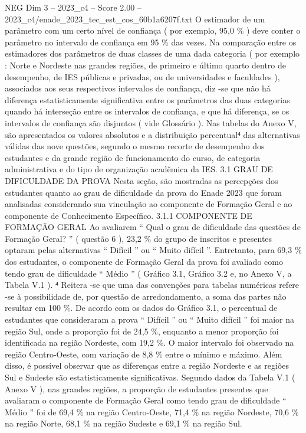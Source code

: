\begin{textsample}{NEG Dim 3 – 2023\_c4 – Score 2.00 – 2023\_c4/enade\_2023\_tec\_est\_cos\_60b1a6207f.txt}
O estimador de um parâmetro com um certo nível de confiança ( por exemplo, 95,0 \% ) deve conter o parâmetro no intervalo de confiança em 95 \% das vezes.
Na comparação entre os estimadores dos parâmetros de duas classes de uma dada categoria ( por exemplo : Norte e Nordeste nas grandes regiões, de primeiro e último quarto dentro de desempenho, de IES públicas e privadas, ou de universidades e faculdades ), associados aos seus respectivos intervalos de confiança, diz -se que não há diferença estatisticamente significativa entre os parâmetros das duas categorias quando há interseção entre os intervalos de confiança, e que há diferença, se os intervalos de confiança são disjuntos ( vide Glossário ).
Nas tabelas do Anexo V, são apresentados os valores absolutos e a distribuição percentual⁴ das alternativas válidas das nove questões, segundo o mesmo recorte de desempenho dos estudantes e da grande região de funcionamento do curso, de categoria administrativa e do tipo de organização acadêmica da IES. 3.1 GRAU DE DIFICULDADE DA PROVA Nesta seção, são mostradas as percepções dos estudantes quanto ao grau de dificuldade da prova do Enade 2023 que foram analisadas considerando sua vinculação ao componente de Formação Geral e ao componente de Conhecimento Específico. 3.1.1 COMPONENTE DE FORMAÇÃO GERAL Ao avaliarem “ Qual o grau de dificuldade das questões de Formação Geral? ” ( questão 6 ), 23,2 \% do grupo de inscritos e presentes optaram pelas alternativas “ Difícil ” ou “ Muito difícil ”.
Entretanto, para 69,3 \% dos estudantes, o componente de Formação Geral da prova foi avaliado como tendo grau de dificuldade “ Médio ” ( Gráfico 3.1, Gráfico 3.2 e, no Anexo V, a Tabela V.1 ). ⁴ Reitera -se que uma das convenções para tabelas numéricas refere -se à possibilidade de, por questão de arredondamento, a soma das partes não resultar em 100 \%.
De acordo com os dados do Gráfico 3.1, o percentual de estudantes que consideraram a prova “ Difícil ” ou “ Muito difícil ” foi maior na região Sul, onde a proporção foi de 24,5 \%, enquanto a menor proporção foi identificada na região Nordeste, com 19,2 \%.
O maior intervalo foi observado na região Centro-Oeste, com variação de 8,8 \% entre o mínimo e máximo.
Além disso, é possível observar que as diferenças entre a região Nordeste e as regiões Sul e Sudeste são estatisticamente significativas.
Segundo dados da Tabela V.1 ( Anexo V ), nas grandes regiões, a proporção de estudantes presentes que avaliaram o componente de Formação Geral como tendo grau de dificuldade “ Médio ” foi de 69,4 \% na região Centro-Oeste, 71,4 \% na região Nordeste, 70,6 \% na região Norte, 68,1 \% na região Sudeste e 69,1 \% na região Sul.

\end{textsample}
